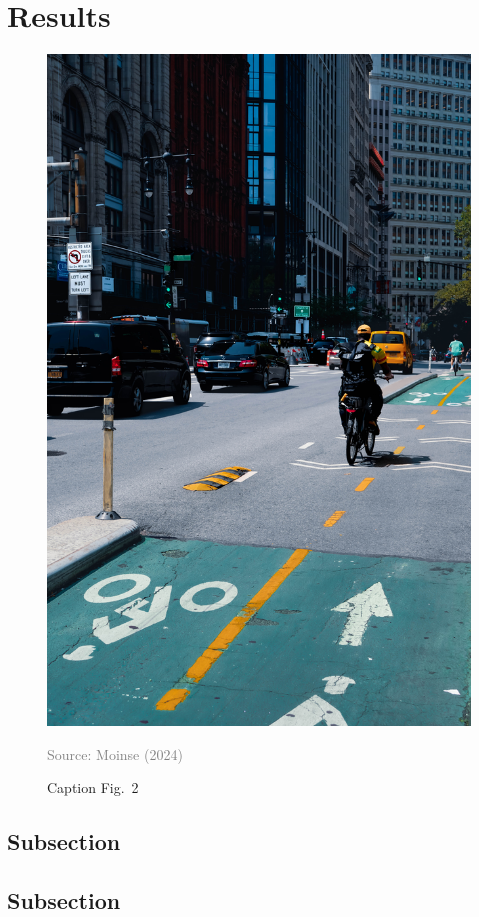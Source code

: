 \documentclass[../main.tex]{subfiles}
\begin{document}
\section{Results}
    \label{section:results}

\lipsum[1-3]

    \begin{figure}[h!] %
    \centering
\includegraphics[width=\columnwidth]{fig/fig-2.jpg}
\caption{Caption Fig.~2}
    \label{fig:2}
    \begin{flushright}
    \begin{minipage}{1\linewidth}
        \justifying
        \noindent
\tiny{\textcolor{gray}{Source: Moinse (2024)}}
        \end{minipage}
    \end{flushright}
    \end{figure}

\subsection{Subsection}
    \label{subsection:4.1}

\lipsum[1-3]

\subsection{Subsection}
    \label{subsection:4.2}

\lipsum[1-3]

    
\end{document}
